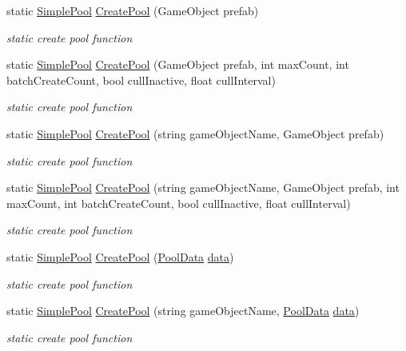 \begin{DoxyCompactItemize}
static \hyperlink{class_hostile_1_1_simple_pool_1_1_simple_pool}{Simple\-Pool} \hyperlink{class_hostile_1_1_simple_pool_1_1_simple_pool_a2118b754824ff7c494cdeeefdb39799c}{Create\-Pool} (Game\-Object prefab)
\begin{DoxyCompactList}\small\item\em static create pool function \end{DoxyCompactList}\item 
static \hyperlink{class_hostile_1_1_simple_pool_1_1_simple_pool}{Simple\-Pool} \hyperlink{class_hostile_1_1_simple_pool_1_1_simple_pool_aefa2c8d18e18971add53235a8a90b31d}{Create\-Pool} (Game\-Object prefab, int max\-Count, int batch\-Create\-Count, bool cull\-Inactive, float cull\-Interval)
\begin{DoxyCompactList}\small\item\em static create pool function \end{DoxyCompactList}\item 
static \hyperlink{class_hostile_1_1_simple_pool_1_1_simple_pool}{Simple\-Pool} \hyperlink{class_hostile_1_1_simple_pool_1_1_simple_pool_a17d72d552366cc3b955c4f071b5cac33}{Create\-Pool} (string game\-Object\-Name, Game\-Object prefab)
\begin{DoxyCompactList}\small\item\em static create pool function \end{DoxyCompactList}\item 
static \hyperlink{class_hostile_1_1_simple_pool_1_1_simple_pool}{Simple\-Pool} \hyperlink{class_hostile_1_1_simple_pool_1_1_simple_pool_abea7c5fc6d9f58c2b18add949d7e11e7}{Create\-Pool} (string game\-Object\-Name, Game\-Object prefab, int max\-Count, int batch\-Create\-Count, bool cull\-Inactive, float cull\-Interval)
\begin{DoxyCompactList}\small\item\em static create pool function \end{DoxyCompactList}\item 
static \hyperlink{class_hostile_1_1_simple_pool_1_1_simple_pool}{Simple\-Pool} \hyperlink{class_hostile_1_1_simple_pool_1_1_simple_pool_ab0de26a367f8d8240ee2635f129a24c8}{Create\-Pool} (\hyperlink{class_hostile_1_1_simple_pool_1_1_simple_pool_1_1_pool_data}{Pool\-Data} \hyperlink{class_hostile_1_1_simple_pool_1_1_simple_pool_a59cc2475ae874886a60c3c457c9f6d17}{data})
\begin{DoxyCompactList}\small\item\em static create pool function \end{DoxyCompactList}\item 
static \hyperlink{class_hostile_1_1_simple_pool_1_1_simple_pool}{Simple\-Pool} \hyperlink{class_hostile_1_1_simple_pool_1_1_simple_pool_a3324989c756877af923d6f7cf0737002}{Create\-Pool} (string game\-Object\-Name, \hyperlink{class_hostile_1_1_simple_pool_1_1_simple_pool_1_1_pool_data}{Pool\-Data} \hyperlink{class_hostile_1_1_simple_pool_1_1_simple_pool_a59cc2475ae874886a60c3c457c9f6d17}{data})
\begin{DoxyCompactList}\small\item\em static create pool function \end{DoxyCompactList}\end{DoxyCompactItemize}
